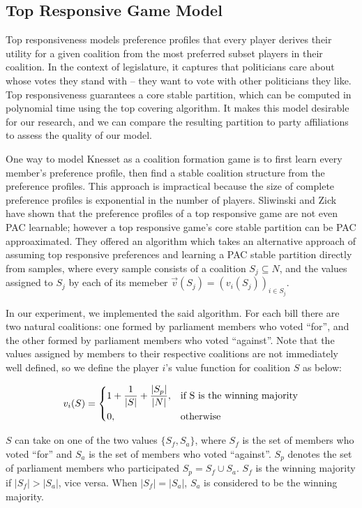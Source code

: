 \documentclass[letterpaper]{article} %
\begin{document}
\subsection{Top Responsive Game Model}
Top responsiveness models preference profiles that every player derives their utility for a given coalition from the most preferred subset players in their coalition. In the context of legislature, it captures that politicians care about whose votes they stand with – they want to vote with other politicians they like. Top responsiveness guarantees a core stable partition, which can be computed in polynomial time using the top covering algorithm. It makes this model desirable for our research, and we can compare the resulting partition to party affiliations to assess the quality of our model.

One way to model Knesset as a coalition formation game is to first learn every member's preference profile, then find a stable coalition structure from the preference profiles. This approach is impractical because the size of complete preference profiles is exponential in the number of players. Sliwinski and Zick have shown that the preference profiles of a top responsive game are not even PAC learnable; however a top responsive game's core stable partition can be PAC approaximated. They offered an algorithm which takes an alternative approach of assuming top responsive preferences and learning a PAC stable partition directly from samples, where every sample consists of a coalition $S_j \subseteq N$, and the values assigned to $S_j$ by each of its memeber $\vec{v}(S_j) = (v_i(S_j))_{i \in S_j}$.

In our experiment, we implemented the said algorithm. For each bill there are two natural coalitions: one formed by parliament members who voted ``for'', and the other formed by parliament members who voted ``against''. Note that the values assigned by members to their respective coalitions are not immediately well defined, so we define the player $i$'s value function for coalition $S$ as below:

\[
  v_i(S) = 
  \begin{dcases}
      1 + \frac{1}{|S|} + \frac{|S_p|}{|N|},& \text{if S is the winning majority}\\
      0,              & \text{otherwise}
  \end{dcases}
\]

$S$ can take on one of the two values $\{S_f, S_a\}$, where $S_f$ is the set of members who voted ``for'' and $S_a$ is the set of members who voted ``against''. $S_p$ denotes the set of parliament members who participated $S_p = S_f \cup S_a$. $S_f$ is the winning majority if $|S_f| > |S_a|$, vice versa. When $|S_f| = |S_a|$, $S_a$ is considered to be the winning majority.
\end{document}

